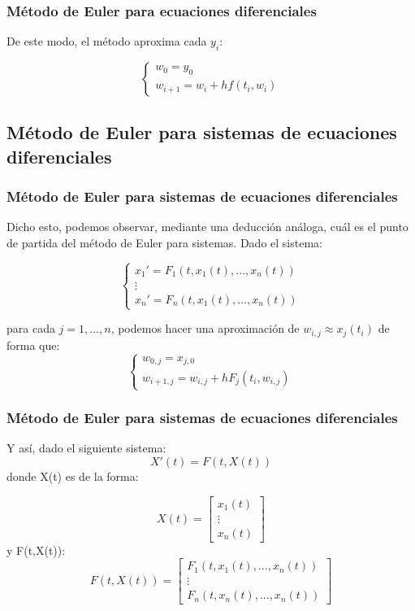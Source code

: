 \documentclass{beamer}
\begin{document}
\begin{frame}
	\frametitle{Método de Euler para ecuaciones diferenciales}
	
	De este modo, el método aproxima cada $y_i$:
	
	$$
	\begin{cases}
	w_0=y_0\\
	w_{i+1}=w_i + hf(t_i,w_i)
	\end{cases}
	$$
\end{frame}

\subsection{Método de Euler para sistemas de ecuaciones diferenciales}
\begin{frame}
	\frametitle{Método de Euler para sistemas de ecuaciones diferenciales}
	
	Dicho esto, podemos observar, mediante una deducción análoga, cuál es el punto de partida del método de Euler para sistemas. Dado el sistema:
	
	$$
	\begin{cases}
	x_1'=F_1(t,x_1(t),...,x_n(t)) \\
	\vdots\\
	x_n'=F_n(t,x_1(t),...,x_n(t))
	\end{cases}
	$$
	
 para cada $j=1,...,n$, podemos hacer una aproximación de $w_{i,j} \approx x_j(t_i)$ de forma que:
 $$
 \begin{cases}
 w_{0,j}=x_{j,0} \\
 w_{i+1,j}=w_{i,j}+ hF_j(t_i,w_{i,j})
 \end{cases}
 $$ 
\end{frame}

\begin{frame}
	\frametitle{Método de Euler para sistemas de ecuaciones diferenciales}
	
	Y así, dado el siguiente sistema: $$
	X'(t)=F(t,X(t))
	$$
	donde X(t) es de la forma:
	
	\begin{equation*}
	X(t)=\begin{bmatrix}
	x_1(t) \\
	\vdots \\
	x_n(t)
	\end{bmatrix}
	\end{equation*}
	y F(t,X(t)):
	\begin{equation*}
	F(t,X(t))=\begin{bmatrix}
	F_1(t,x_1(t),...,x_n(t)) \\
	\vdots \\
	F_n(t,x_n(t),...,x_n(t))
	\end{bmatrix}
	\end{equation*}
	
	
	 
\end{frame}
\end{document}
